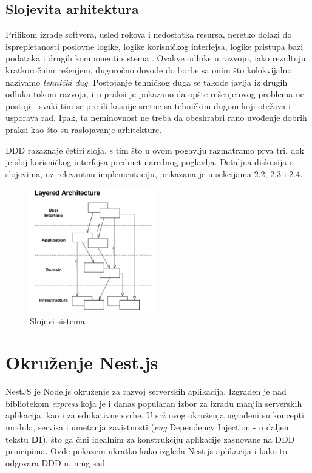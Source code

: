 \documentclass[12pt,oneside]{memoir}
\begin{document}
\subsection{Slojevita arhitektura}
Prilikom izrade softvera, usled rokova i nedostatka resursa, neretko dolazi do isprepletanosti poslovne logike, logike korisničkog interfejsa, logike pristupa bazi podataka i drugih komponenti sistema \cite{dddfull}. Ovakve odluke u razvoju, iako rezultuju kratkoročnim rešenjem, dugoročno dovode do borbe sa onim što kolokvijalno nazivamo \textit{tehnički dug}. Postojanje tehničkog duga se takođe javlja iz drugih odluka tokom razvoja, i u praksi je pokazano da opšte rešenje ovog problema ne postoji - svaki tim se pre ili kasnije sretne sa tehničkim dugom koji otežava i usporava rad. Ipak, ta neminovnost ne treba da obeshrabri rano uvođenje dobrih praksi kao što su raslojavanje arhitekture. 

DDD razaznaje četiri sloja, s tim što u ovom pogavlju razmatramo prva tri, dok je sloj korisničkog interfejsa predmet narednog poglavlja. Detaljna diskusija o slojevima, uz relevantnu implementaciju, prikazana je u sekcijama 2.2, 2.3 i 2.4.

\begin{figure}[h]
  \centering
  \includegraphics[width=0.5\textwidth]{docs/images/ch_2/DDD-Layered-Architecture-2.png} 
  \caption{Slojevi sistema \cite{dddfull}}
  \label{fig:sample}
\end{figure}

\section{Okruženje Nest.js}

NestJS \cite{nestjsdocs} je Node.js okruženje za razvoj serverskih aplikacija. Izgrađen je nad bibliotekom \textit{express} \cite{expressjsdocs} koja je i danas popularan izbor za izradu manjih serverskih aplikacija, kao i za edukativne svrhe.  U srž ovog okruženja ugrađeni su koncepti modula, servisa i umetanja zavistnosti (\textit{eng} Dependency Injection - u daljem tekstu \textbf{DI}), što ga čini idealnim za konstrukciju aplikacije zasnovane na DDD principima. Ovde pokazem ukratko kako izgleda Nest.js aplikacija i kako to odgovara DDD-u, nmg sad
\end{document}

